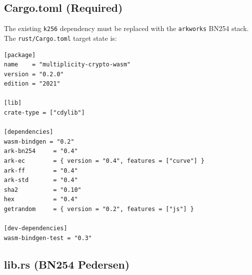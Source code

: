 \documentclass[11pt,letterpaper]{article}
\begin{document}
\subsection{Cargo.toml (Required)}

The existing \texttt{k256} dependency must be replaced with the \texttt{arkworks}
BN254 stack. The \texttt{rust/Cargo.toml} target state is:

\begin{lstlisting}[language={},caption={packages/multiplicity-crypto/rust/Cargo.toml (target state)}]
[package]
name    = "multiplicity-crypto-wasm"
version = "0.2.0"
edition = "2021"

[lib]
crate-type = ["cdylib"]

[dependencies]
wasm-bindgen = "0.2"
ark-bn254     = "0.4"
ark-ec        = { version = "0.4", features = ["curve"] }
ark-ff        = "0.4"
ark-std       = "0.4"
sha2          = "0.10"
hex           = "0.4"
getrandom     = { version = "0.2", features = ["js"] }

[dev-dependencies]
wasm-bindgen-test = "0.3"
\end{lstlisting}

\subsection{lib.rs (BN254 Pedersen)}
\end{document}
